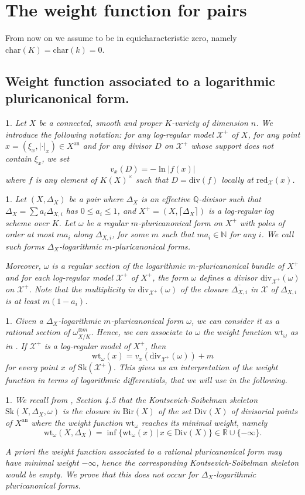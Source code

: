 \documentclass{amsart}%
\numberwithin{equation}{subsection}
\theoremstyle{plain2}
\theoremstyle{definition2}
\theoremstyle{stepstyle}
\theoremstyle{point}
\theoremstyle{subpoint}
\newtheorem{subpoint}[equation]{}%
\newcommand{\spa}[1]{\begin{subpoint}#1\end{subpoint}}           %
\newcommand{\N}{\ensuremath{\mathbb{N}}}
\newcommand{\Q}{\ensuremath{\mathbb{Q}}}
\newcommand{\R}{\ensuremath{\mathbb{R}}}
\newcommand{\cX}{\ensuremath{\mathscr{X}}}
\renewcommand{\R}{\ensuremath{\mathbb{R}}}
\newcommand{\redu}{\mathrm{red}}
\newcommand{\an}{\mathrm{an}}
\newcommand{\divisor}{\mathrm{div}}
\newcommand{\weight}{\mathrm{wt}}
\newcommand{\Sk}{\mathrm{Sk}}
\begin{document}
\section{The weight function for pairs}
From now on we assume to be in equicharacteristic zero, namely $\text{char}(K)=\text{char}(k)=0$.
\subsection{Weight function associated to a logarithmic pluricanonical form.}
\spa{Let $X$ be a connected, smooth and proper $K$-variety of dimension $n$. We introduce the following notation: for any log-regular model $\cX^+$ of $X$, for any point $x = (\xi_x,|\cdot|_x) \in X^\an$ and for any divisor $D$ on $\cX^+$ whose support does not contain $\xi_x$, we set $$v_x(D) = - \ln |f(x)|$$ where $f$ is any element of $K(X)^\times$ such that $D= \divisor(f)$ locally at $\redu_{\cX}(x)$.}

\spa{Let $(X,\Delta_X)$ be a pair where $\Delta_X$ is an effective $\Q$-divisor such that $\Delta_X= \sum a_i \Delta_{X,i}$ has $0 \leqslant a_i \leqslant 1$, and  $X^+=(X,\lceil \Delta_X \rceil)$ is a log-regular log scheme over $K$. Let $\omega$ be a regular $m$-pluricanonical form on $X^+$ with poles of order at most $ma_i$ along $\Delta_{X,i}$, for some $m$ such that $ma_i \in \N$ for any $i$. We call such forms $\Delta_X$-logarithmic $m$-pluricanonical forms.

Moreover, $\omega$ is a regular section of the logarithmic $m$-pluricanonical bundle of $X^+$ and for each log-regular model $\cX^+$ of $X^+$, the form $\omega$ defines a divisor $\divisor_{\cX^+}(\omega)$ on $\cX^+$. Note that the multiplicity in $\divisor_{\cX^+}(\omega)$ of the closure $\overline{\Delta_{X,i}}$ in $\cX$ of $\Delta_{X,i}$ is at least $m(1-a_i)$.
}

\spa{Given a $\Delta_X$-logarithmic $m$-pluricanonical form $\omega$, we can consider it as a rational section of $\omega_{X/K}^{\otimes m}$. Hence, we can associate to $\omega$ the weight function $\weight_{\omega}$ as in \cite{MustataNicaise}. If $\cX^+$ is a log-regular model of $X^+$, then $$\weight_{\omega}(x) = v_x(\divisor_{\cX^+}(\omega)) +m $$ for every point $x$ of $\Sk(\cX^+)$. This gives us an interpretation of the weight function in terms of logarithmic differentials, that we will use in the following. }

\spa{We recall from \cite{MustataNicaise}, Section 4.5 that the Kontsevich-Soibelman skeleton $\Sk(X, \Delta_X, \omega)$ is the closure in $\text{Bir}(X)$ of the set $\text{Div}(X) $ of divisorial points of $X^\text{an}$ where the weight function $\weight_\omega$ reaches its minimal weight, namely $$\weight_{\omega}(X, \Delta_X) = \inf \{ \weight_{\omega}(x) \,| \, x \in \text{Div}(X) \} \in \R \cup \{ -\infty\}.$$

A priori the weight function associated to a rational pluricanonical form may have minimal weight $-\infty$, hence the corresponding Kontsevich-Soibelman skeleton would be empty. We prove that this does not occur for $\Delta_X$-logarithmic pluricanonical forms.
}
\end{document}
